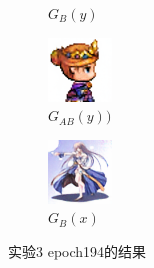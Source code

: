 \documentclass[twocolumn,11pt]{ctexart}
\begin{document}
\begin{figure}[htb]
\begin{subfigure}[b]{0.23\linewidth}
        \caption{$G_B(y)$}
      \end{subfigure}
      \begin{subfigure}[b]{0.23\linewidth}
        \includegraphics[width=\linewidth]{exp3_epoch194_rec_B.png}
        \caption{$G_{AB}(y))$}
      \end{subfigure}
      \begin{subfigure}[b]{0.23\linewidth}
        \includegraphics[width=\linewidth]{exp3_epoch194_idt_B.png}
        \caption{$G_B(x)$}
      \end{subfigure}
      \caption{实验3 epoch194的结果}
      \label{fig:exp3epoch194}
\end{figure}
\end{document}
